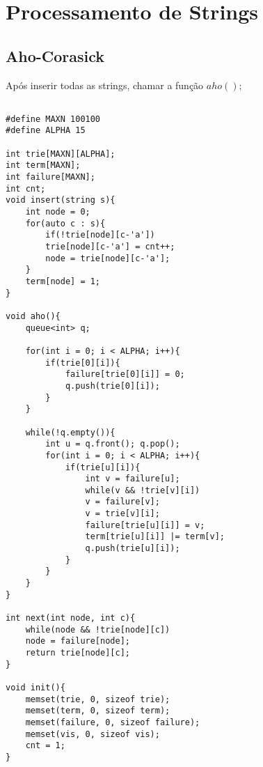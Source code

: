 \chapter{Processamento de Strings}

\section{Aho-Corasick}

Após inserir todas as strings, chamar a função $aho();$

\begin{multicols}{2}
	\begin{lstlisting}

#define MAXN 100100
#define ALPHA 15

int trie[MAXN][ALPHA];
int term[MAXN];
int failure[MAXN];
int cnt;
void insert(string s){
	int node = 0;
	for(auto c : s){
		if(!trie[node][c-'a'])
		trie[node][c-'a'] = cnt++;
		node = trie[node][c-'a'];
	}
	term[node] = 1;
}

void aho(){
	queue<int> q;
	
	for(int i = 0; i < ALPHA; i++){
		if(trie[0][i]){
			failure[trie[0][i]] = 0;
			q.push(trie[0][i]);
		}
	}
	
	while(!q.empty()){
		int u = q.front(); q.pop();
		for(int i = 0; i < ALPHA; i++){
			if(trie[u][i]){
				int v = failure[u];
				while(v && !trie[v][i])
				v = failure[v];
				v = trie[v][i];
				failure[trie[u][i]] = v;
				term[trie[u][i]] |= term[v];
				q.push(trie[u][i]);
			}	
		}
	}
}

int next(int node, int c){
	while(node && !trie[node][c])
	node = failure[node];
	return trie[node][c];
}

void init(){
	memset(trie, 0, sizeof trie);
	memset(term, 0, sizeof term);
	memset(failure, 0, sizeof failure);
	memset(vis, 0, sizeof vis);
	cnt = 1;
}


\end{lstlisting}
\end{multicols}